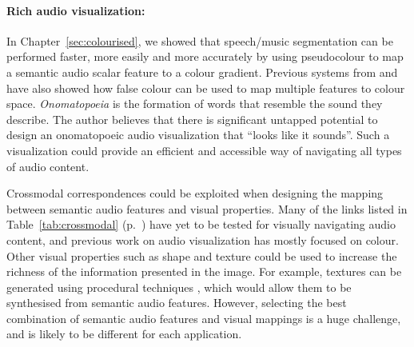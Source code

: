 \paragraph{Rich audio visualization:}

In Chapter~\ref{sec:colourised}, we showed that speech/music segmentation can be performed faster, more easily and more
accurately by using pseudocolour to map a semantic audio scalar feature to a colour gradient. Previous systems from
\citet{Tzanetakis2000} and \citet{Mason2007} have also showed how false colour can be used to map multiple features to
colour space.  \textit{Onomatopoeia} is the formation of words that resemble the sound they describe.  The author
believes that there is significant untapped potential to design an onomatopoeic audio visualization that ``looks like
it sounds''.  Such a visualization could provide an efficient and accessible way of navigating all types of audio
content.

Crossmodal correspondences could be exploited when designing the mapping between semantic audio features and visual
properties.  Many of the links listed in Table~\ref{tab:crossmodal} (p.~\pageref{tab:crossmodal}) have yet to be tested
for visually navigating audio content, and previous work on audio visualization has mostly focused on colour.  Other
visual properties such as shape and texture could be used to increase the richness of the information presented in the
image.  For example, textures can be generated using procedural techniques \citep{Ebert1994}, which would allow them to
be synthesised from semantic audio features.  However, selecting the best combination of semantic audio features and
visual mappings is a huge challenge, and is likely to be different for each application.



